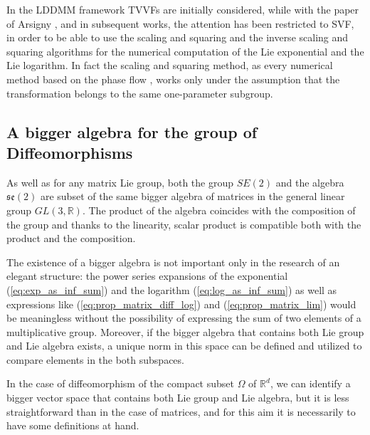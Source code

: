 In the LDDMM framework \cite{beg2005computing} TVVFs are initially considered, while with the paper of Arsigny \cite{arsigny2006log}, and in subsequent works, the attention has been restricted to SVF, in order to be able to use the scaling and squaring and the inverse scaling and squaring algorithms for the numerical computation of the Lie exponential and the Lie logarithm. In fact the scaling and squaring method, as every numerical method based on the phase flow \cite{ying2006phase}, works only under the assumption that the transformation belongs to the same one-parameter subgroup.


\subsection{A bigger algebra for the group of Diffeomorphisms}\label{subse:bigger_algebra}
As well as for any matrix Lie group, both the group $SE(2)$ and the algebra $\mathfrak{se}(2)$ are subset of the same bigger algebra of matrices in the general linear group $GL(3,\mathbb{R})$. The product of the algebra coincides with the composition of the group and thanks to the linearity, scalar product is compatible both with the product and the composition.

The existence of a bigger algebra is not important only in the research of an elegant structure: the power series expansions of the exponential (\ref{eq:exp_as_inf_sum}) and the logarithm (\ref{eq:log_as_inf_sum}) as well as expressions like (\ref{eq:prop_matrix_diff_log}) and (\ref{eq:prop_matrix_lim}) would be meaningless without the possibility of expressing the sum of two elements of a multiplicative group. Moreover, if the bigger algebra that contains both Lie group and Lie algebra exists, a unique norm in this space can be defined and utilized to compare elements in the both subspaces.

In the case of diffeomorphism of the compact subset $\Omega$ of $\mathbb{R}^d$, we can identify a bigger vector space that contains both Lie group and Lie algebra, but it is less straightforward than in the case of matrices, and for this aim it is necessarily to have some definitions at hand.

